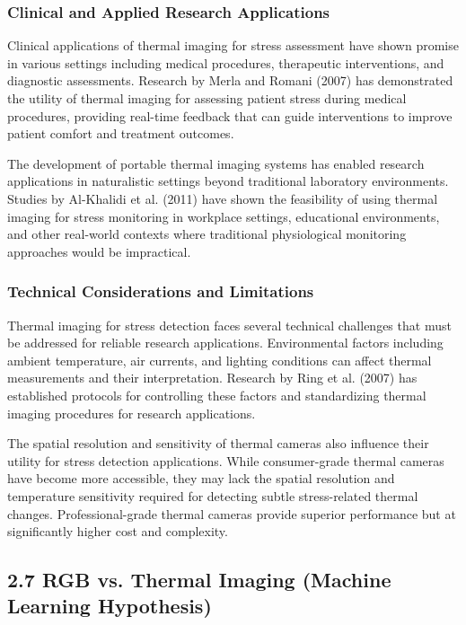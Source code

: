 \documentclass[11pt,a4paper]{article}
\begin{document}
\subsubsection{Clinical and Applied Research Applications}

Clinical applications of thermal imaging for stress assessment have shown promise in various settings including medical
procedures, therapeutic interventions, and diagnostic assessments. Research by Merla and Romani (2007) has demonstrated
the utility of thermal imaging for assessing patient stress during medical procedures, providing real-time feedback that
can guide interventions to improve patient comfort and treatment outcomes.

The development of portable thermal imaging systems has enabled research applications in naturalistic settings beyond
traditional laboratory environments. Studies by Al-Khalidi et al. (2011) have shown the feasibility of using thermal
imaging for stress monitoring in workplace settings, educational environments, and other real-world contexts where
traditional physiological monitoring approaches would be impractical.

\subsubsection{Technical Considerations and Limitations}

Thermal imaging for stress detection faces several technical challenges that must be addressed for reliable research
applications. Environmental factors including ambient temperature, air currents, and lighting conditions can affect
thermal measurements and their interpretation. Research by Ring et al. (2007) has established protocols for controlling
these factors and standardizing thermal imaging procedures for research applications.

The spatial resolution and sensitivity of thermal cameras also influence their utility for stress detection
applications. While consumer-grade thermal cameras have become more accessible, they may lack the spatial resolution and
temperature sensitivity required for detecting subtle stress-related thermal changes. Professional-grade thermal cameras
provide superior performance but at significantly higher cost and complexity.

\subsection{2.7 RGB vs. Thermal Imaging (Machine Learning Hypothesis)}
\end{document}
